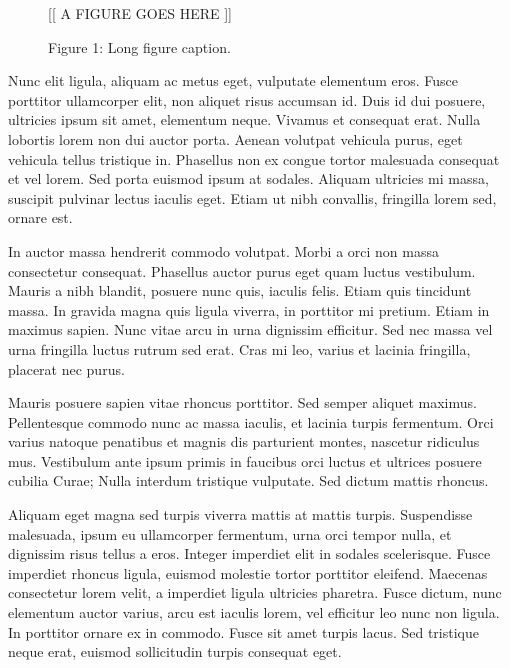 \begin{figure}
  \begin{center}
    [[ A FIGURE GOES HERE ]]
  \end{center}
\captionsetup{labelformat=empty}
\caption[Short figure caption for list of figures]{Figure 1: Long figure caption.}
\label{fig:a}
\end{figure}

Nunc elit ligula, aliquam ac metus eget, vulputate elementum eros. Fusce
porttitor ullamcorper elit, non aliquet risus accumsan id. Duis id dui posuere,
ultricies ipsum sit amet, elementum neque. Vivamus et consequat erat. Nulla
lobortis lorem non dui auctor porta. Aenean volutpat vehicula purus, eget
vehicula tellus tristique in. Phasellus non ex congue tortor malesuada consequat
et vel lorem. Sed porta euismod ipsum at sodales. Aliquam ultricies mi massa,
suscipit pulvinar lectus iaculis eget. Etiam ut nibh convallis, fringilla lorem
sed, ornare est.

In auctor massa hendrerit commodo volutpat. Morbi a orci non massa consectetur
consequat. Phasellus auctor purus eget quam luctus vestibulum. Mauris a nibh
blandit, posuere nunc quis, iaculis felis. Etiam quis tincidunt massa. In
gravida magna quis ligula viverra, in porttitor mi pretium. Etiam in maximus
sapien. Nunc vitae arcu in urna dignissim efficitur. Sed nec massa vel urna
fringilla luctus rutrum sed erat. Cras mi leo, varius et lacinia fringilla,
placerat nec purus. 

Mauris posuere sapien vitae rhoncus porttitor. Sed semper aliquet
maximus. Pellentesque commodo nunc ac massa iaculis, et lacinia turpis
fermentum. Orci varius natoque penatibus et magnis dis parturient montes,
nascetur ridiculus mus. Vestibulum ante ipsum primis in faucibus orci luctus et
ultrices posuere cubilia Curae; Nulla interdum tristique vulputate. Sed dictum
mattis rhoncus.

Aliquam eget magna sed turpis viverra mattis at mattis turpis. Suspendisse
malesuada, ipsum eu ullamcorper fermentum, urna orci tempor nulla, et dignissim
risus tellus a eros. Integer imperdiet elit in sodales scelerisque. Fusce
imperdiet rhoncus ligula, euismod molestie tortor porttitor eleifend. Maecenas
consectetur lorem velit, a imperdiet ligula ultricies pharetra. Fusce dictum,
nunc elementum auctor varius, arcu est iaculis lorem, vel efficitur leo nunc non
ligula. In porttitor ornare ex in commodo. Fusce sit amet turpis lacus. Sed
tristique neque erat, euismod sollicitudin turpis consequat eget.

